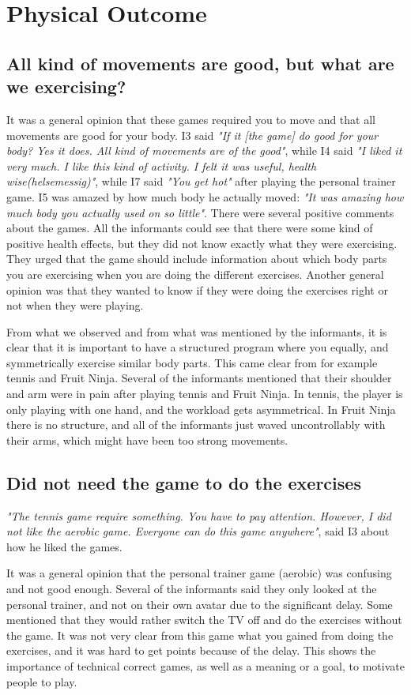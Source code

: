 \section{Physical Outcome}

\subsection{All kind of movements are good, but what are we exercising?}
It was a general opinion that these games required you to move and that all movements are good for your body. I3 said \emph{"If it [the game] do good for your body? Yes it does. All kind of movements are of the good"}, while I4 said  \emph{"I liked it very much. I like this kind of activity. I felt it was useful, health wise(helsemessig)"}, while I7 said \emph{"You get hot"} after playing the personal trainer game. I5 was amazed by how much body he actually moved: \emph{"It was amazing how much body you actually used on so little"}. There were several positive comments about the games. All the informants could see that there were some kind of positive health effects, but they did not know exactly what they were exercising. They urged that the game should include information about which body parts you are exercising when you are doing the different exercises. Another general opinion was that they wanted to know if they were doing the exercises right or not when they were playing. 

From what we observed and from what was mentioned by the informants, it is clear that it is important to have a structured program where you equally, and symmetrically exercise similar body parts. This came clear from for example tennis and Fruit Ninja. Several of the informants mentioned that their shoulder and arm were in pain after playing tennis and Fruit Ninja. In tennis, the player is only playing with one hand, and the workload gets asymmetrical. In Fruit Ninja there is no structure, and all of the informants just waved uncontrollably with their arms, which might have been too strong movements.

\subsection{Did not need the game to do the exercises}
\emph{"The tennis game require something. You have to pay attention. However, I did not like the aerobic game. Everyone can do this game anywhere"}, said I3 about how he liked the games. 

It was a general opinion that the personal trainer game (aerobic) was confusing and not good enough. Several of the informants said they only looked at the personal trainer, and not on their own avatar due to the significant delay. Some mentioned that they would rather switch the TV off and do the exercises without the game. It was not very clear from this game what you gained from doing the exercises, and it was hard to get points because of the delay. This shows the importance of technical correct games, as well as a meaning or a goal, to motivate people to play. 

